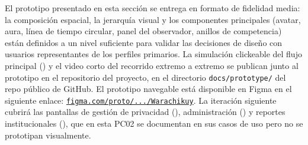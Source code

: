 El prototipo presentado en esta sección se entrega en formato de
fidelidad media: la composición espacial, la jerarquía visual y los
componentes principales (avatar, aura, línea de tiempo circular,
panel del observador, anillos de competencia) están definidos a un
nivel suficiente para validar las decisiones de diseño con usuarios
representantes de los perfiles primarios. La simulación clickeable
del flujo principal () y el video corto del recorrido extremo
a extremo se publican junto al prototipo en el repositorio del
proyecto, en el directorio \texttt{docs/prototype/} del repo
público de GitHub. El prototipo navegable está disponible en Figma
en el siguiente enlace:
\href{https://www.figma.com/proto/hZttO5TGjofestkKuw73nY/Warachikuy?node-id=2014-3672&p=f&t=AekkWhjgguGksNPE-1&scaling=scale-down&content-scaling=fixed&page-id=0\%3A1&starting-point-node-id=2014\%3A3604}{\texttt{figma.com/proto/.../Warachikuy}}.
La iteración siguiente cubrirá las pantallas de gestión de privacidad
(), administración () y reportes institucionales
(), que en esta PC02 se documentan en sus casos de uso pero
no se prototipan visualmente.
